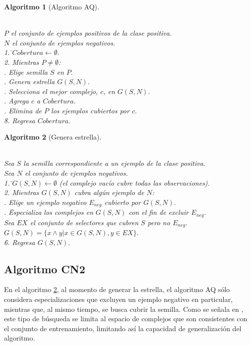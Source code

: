 \documentclass[12pt]{report}
\theoremstyle{break}
\theoremstyle{break}
\newtheorem{algoritmo}{Algoritmo}[chapter]
\begin{document}
\begin{algoritmo}[Algoritmo AQ]
\begin{tabbing}
\\$P$ el conjunto de ejemplos positivos de la clase positiva. 
\\$N$ el conjunto de ejemplos negativos.\\
1. \=$Cobertura\leftarrow \emptyset.$ \\
2. Mientras $P \neq \emptyset$:\\
 . Elige semilla $S$ en $P.$\\
 . Genera estrella $G(S,N).$\\
 . Selecciona el mejor complejo, $c$, en $G(S,N).$\\
 . Agrega $c$ a $Cobertura.$\\
 . Elimina de $P$ los ejemplos cubiertos por $c.$\\
\=8. Regresa $Cobertura.$
\end{tabbing}
\label{algo:AQ}
\end{algoritmo}

\begin{algoritmo}[Genera estrella]
\begin{tabbing}
\\Sea $S$ la semilla correspondiente a un ejemplo de la clase positiva.
\\Sea $N$ el conjunto de ejemplos negativos.\\
1. \=$G(S,N)\leftarrow \emptyset$ (el complejo vacío cubre todas las observaciones).\\
2. Mientras $G(S,N)$ cubra algún ejemplo de $N$:\\
 . Elige un ejemplo negativo $E_{neg}$ cubierto por $G(S,N).$\\
 . \= Especializa los complejos en $G(S,N)$ con el fin de excluir $E_{neg}.$\\
 \> Sea $EX$ el conjunto de selectores que cubren $S$ pero no $E_{neg}.$ \\
 \> $G(S,N)=\{x \wedge y \vert x \in G(S,N), y \in EX \}.$\\
\=6. Regresa $G(S,N).$
\end{tabbing}
\label{algo:AQ genera estrella}
\end{algoritmo}

\subsection{Algoritmo CN2}
\label{subseccion:algoritmo cn2}
En el algoritmo \ref{algo:AQ genera estrella}, al momento de generar la estrella, el algoritmo AQ sólo considera especializaciones que excluyen un ejemplo negativo en particular, mientras que, al mismo tiempo, se busca cubrir la semilla. Como se señala en \cite{CN2-Clark1989}, este tipo de búsqueda se limita al espacio de complejos que son consistentes con el conjunto de entrenamiento, limitando así la capacidad de generalización del algoritmo.
\end{document}
